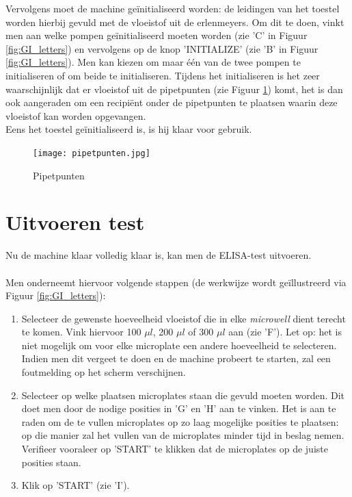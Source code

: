 \documentclass[a4paper,twoside,kulak]{kulakreport} %
\begin{document}
Vervolgens moet de machine geïnitialiseerd worden: de leidingen van het toestel worden hierbij gevuld met de vloeistof uit de erlenmeyers. Om dit te doen, vinkt men aan welke pompen geïnitialiseerd moeten worden (zie 'C' in Figuur \ref{fig:GI_letters}) en vervolgens op de knop 'INITIALIZE' (zie 'B' in Figuur \ref{fig:GI_letters}). Men kan kiezen om maar één van de twee pompen te initialiseren of om beide te initialiseren. Tijdens het initialiseren is het zeer waarschijnlijk dat er vloeistof uit de pipetpunten (zie Figuur \ref{fig: pipetpunten}) komt, het is dan ook aangeraden om een recipiënt onder de pipetpunten te plaatsen waarin deze vloeistof kan worden opgevangen. \\
Eens het toestel geïnitialiseerd is, is hij klaar voor gebruik. 

\begin{figure}[h]
	\centering
	\texttt{[image: pipetpunten.jpg]}
	\caption{Pipetpunten}
	\label{fig: pipetpunten}
	\end{figure} 


\chapter{Uitvoeren test}

Nu de machine klaar volledig klaar is, kan men de ELISA-test uitvoeren. \\ \\
Men onderneemt hiervoor volgende stappen (de werkwijze wordt geïllustreerd via Figuur \ref{fig:GI_letters}):
\begin{enumerate}
	\item Selecteer de gewenste hoeveelheid vloeistof die in elke \textit{microwell} dient terecht te komen. Vink hiervoor 100 $\mu l$, 200 $\mu l$ of 300 $\mu l$ aan (zie 'F'). Let op: het is niet mogelijk om voor elke microplate een andere hoeveelheid te selecteren. Indien men dit vergeet te doen en de machine probeert te starten, zal een foutmelding op het scherm verschijnen.
	\item Selecteer op welke plaatsen microplates staan die gevuld moeten worden. Dit doet men door de nodige posities in 'G' en 'H' aan te vinken. Het is aan te raden om de te vullen microplates op zo laag mogelijke posities te plaatsen: op die manier zal het vullen van de microplates minder tijd in beslag nemen. Verifieer vooraleer op 'START' te klikken dat de microplates op de juiste posities staan.
	\item Klik op 'START' (zie 'I').  
\end{enumerate}
\end{document}
